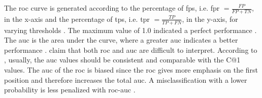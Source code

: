 The \ac{roc} curve is generated according to the percentage of \acp{fp}, i.e. \ac{fpr} $= \frac{FP}{FP+TN}$, in the x-axis and 
the percentage of \acp{tp}, i.e. \ac{tpr} $=\frac{TP}{TP+FN}$, in the y-axis,
for varying thresholds \citep{kocher_unine_2015,neal_surveying_2018}.
The maximum value of 1.0 indicated a perfect performance \citep{kocher_unine_2015}.
The \ac{auc} is the area under the curve, where a greater \ac{auc} indicates a better performance \citep{neal_surveying_2018}.
\citet{kocher_unine_2015} claim that both \ac{roc} and \ac{auc} are difficult to interpret.
According to \citet{kocher_unine_2015}, usually, the \ac{auc} values should be consistent and comparable with the C@1 values.
The \ac{auc} of the \ac{roc} is biased since the \ac{roc} gives more emphasis 
on the first position and therefore increases the total \ac{auc}.
A misclassification with a lower probability is less penalized with \ac{roc-auc} \citep{kocher_unine_2015}.